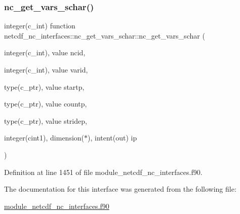 \subsubsection{\texorpdfstring{nc\+\_\+get\+\_\+vars\+\_\+schar()}{nc\_get\_vars\_schar()}}
{\footnotesize\ttfamily integer(c\+\_\+int) function netcdf\+\_\+nc\+\_\+interfaces\+::nc\+\_\+get\+\_\+vars\+\_\+schar\+::nc\+\_\+get\+\_\+vars\+\_\+schar (\begin{DoxyParamCaption}\item[{integer(c\+\_\+int), value}]{ncid,  }\item[{integer(c\+\_\+int), value}]{varid,  }\item[{type(c\+\_\+ptr), value}]{startp,  }\item[{type(c\+\_\+ptr), value}]{countp,  }\item[{type(c\+\_\+ptr), value}]{stridep,  }\item[{integer(cint1), dimension($\ast$), intent(out)}]{ip }\end{DoxyParamCaption})}



Definition at line 1451 of file module\+\_\+netcdf\+\_\+nc\+\_\+interfaces.\+f90.



The documentation for this interface was generated from the following file\+:\begin{DoxyCompactItemize}
\item 
\hyperlink{module__netcdf__nc__interfaces_8f90}{module\+\_\+netcdf\+\_\+nc\+\_\+interfaces.\+f90}\end{DoxyCompactItemize}
